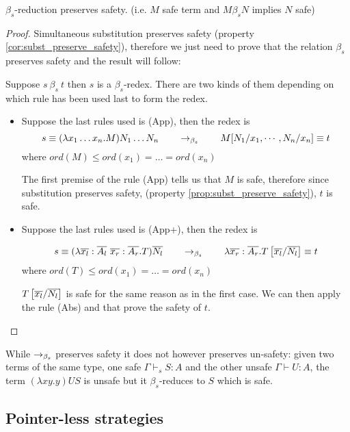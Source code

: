\begin{lem}
$\beta_s$-reduction preserves safety. (i.e. $M$ safe term and $M
\beta_s N$ implies $N$ safe)
\end{lem}


\begin{proof}
Simultaneous substitution preserves safety (property
\ref{cor:subst_preserve_safety}), therefore we just need to prove
that the relation $\beta_s$ preserves safety and the result will
follow:

 Suppose $s\ \beta_s\ t$ then $s$ is a $\beta_s$-redex. There are two kinds of them
 depending on which rule has been used last to form the redex.

\begin{itemize}
\item Suppose the last rules used is (App), then the redex is
$$s \equiv (\lambda x_1 \ldots x_n . M) N_1 \ldots N_n \qquad \rightarrow_{\beta_s} \qquad M[N_1 / x_1 , \cdots, N_n / x_n] \equiv t$$
where $ord(M) \leq ord(x_1) = \ldots = ord(x_n)$

The first premise of the rule (App) tells us that $M$ is safe,
therefore since substitution preserves safety, (property
\ref{prop:subst_preserve_safety}), $t$ is safe.

\item Suppose the last rules used is (App+), then the redex is

 $$
s \equiv  (\lambda \overline{x_l} : \overline{A_l} \
\overline{x_r}: \overline{A_r} . T) \overline{N_l} \qquad \rightarrow_{\beta_s}
\qquad \lambda \overline{x_r}: \overline{A_r} .
T\left[ \overline{x_l}/\overline{N_l} \right] \equiv  t
$$
where $ord(T) \leq ord(x_1) = \ldots = ord(x_n)$

$T\left[ \overline{x_l}/\overline{N_l} \right]$ is safe for the same
reason as in the first case. We can then apply the rule (Abs) and
that prove the safety of $t$.
\end{itemize}
\end{proof}



\begin{rem}
\label{rem:betasred_notpreserv_unsafety} While $\rightarrow_{\beta_s}$ preserves
safety it does not however preserves un-safety: given two terms of
the same type, one safe $\Gamma \vdash_s S : A$ and the other unsafe
$\Gamma \vdash U : A$, the term $(\lambda x y . y) U S$ is unsafe
but it $\beta_s$-reduces to $S$ which is safe.
\end{rem}

\subsection{Pointer-less strategies}
\label{subsec:ptrless_strat}

